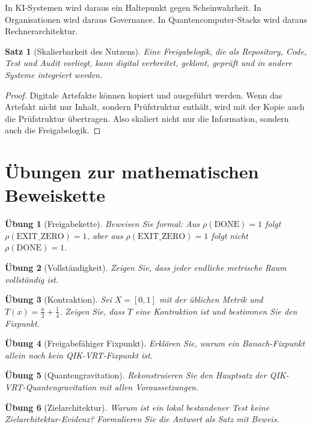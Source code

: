 \documentclass[11pt,a4paper,oneside]{scrartcl}
\theoremstyle{qikstyle}
\newtheorem{satz}{Satz}[section]
\newtheorem{uebung}{Übung}[section]
\newcommand{\DONE}{\mathrm{DONE}}
\newcommand{\EXIT}{\mathrm{EXIT\_ZERO}}
\begin{document}
In KI-Systemen wird daraus ein Haltepunkt gegen Scheinwahrheit. In Organisationen wird daraus Governance. In Quantencomputer-Stacks wird daraus Rechnerarchitektur.

\begin{satz}[Skalierbarkeit des Nutzens]
Eine Freigabelogik, die als Repository, Code, Test und Audit vorliegt, kann digital verbreitet, geklont, geprüft und in andere Systeme integriert werden.
\end{satz}

\begin{proof}
Digitale Artefakte können kopiert und ausgeführt werden. Wenn das Artefakt nicht nur Inhalt, sondern Prüfstruktur enthält, wird mit der Kopie auch die Prüfstruktur übertragen. Also skaliert nicht nur die Information, sondern auch die Freigabelogik.
\end{proof}
\newpage

\section{Übungen zur mathematischen Beweiskette}

\begin{uebung}[Freigabekette]
Beweisen Sie formal: Aus \(\rho(\DONE)=1\) folgt \(\rho(\EXIT)=1\), aber aus \(\rho(\EXIT)=1\) folgt nicht \(\rho(\DONE)=1\).
\end{uebung}

\begin{uebung}[Vollständigkeit]
Zeigen Sie, dass jeder endliche metrische Raum vollständig ist.
\end{uebung}

\begin{uebung}[Kontraktion]
Sei \(X=[0,1]\) mit der üblichen Metrik und \(T(x)=\frac{x}{2}+\frac14\). Zeigen Sie, dass \(T\) eine Kontraktion ist und bestimmen Sie den Fixpunkt.
\end{uebung}

\begin{uebung}[Freigabefähiger Fixpunkt]
Erklären Sie, warum ein Banach-Fixpunkt allein noch kein QIK-VRT-Fixpunkt ist.
\end{uebung}

\begin{uebung}[Quantengravitation]
Rekonstruieren Sie den Hauptsatz der QIK-VRT-Quantengravitation mit allen Voraussetzungen.
\end{uebung}

\begin{uebung}[Zielarchitektur]
Warum ist ein lokal bestandener Test keine Zielarchitektur-Evidenz? Formulieren Sie die Antwort als Satz mit Beweis.
\end{uebung}
\newpage
\end{document}
